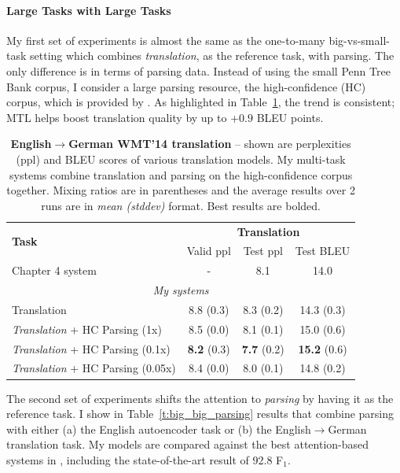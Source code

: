 \paragraph{Large Tasks with Large Tasks}
\label{subsub:ll}
My first set of experiments is almost the same as the one-to-many
big-vs-small-task setting
which combines {\it translation}, as the reference
task, with parsing. The only difference is in terms of parsing data. Instead of using the
small Penn Tree Bank corpus, I consider a large parsing resource, the
high-confidence (HC) corpus, which is provided by \citet{vinyals15grammar}.
As highlighted in Table~\ref{t:big_big_translation}, the
trend is consistent; MTL helps boost translation quality by up
to +$0.9$ BLEU points. 

\begin{table}[tbh!]
\centering
\begin{tabular}{l|c|c|c}
\multirow{ 2}{*}{\bf{Task}} & \multicolumn{3}{c}{{\bf Translation}}\\
  \cline{2-4}
  & Valid ppl & Test ppl & Test BLEU\\
  \hline
Chapter 4 system \citep{luong15attn} & - & 8.1 & 14.0 \\
  \hline
\multicolumn{4}{c}{{\it My systems}} \\
  \hline
Translation & 8.8 (0.3) & 8.3 (0.2) & 14.3 (0.3)\\
  \hline
{\it Translation} + HC Parsing (1x) &  8.5 (0.0) & 8.1 (0.1) & 15.0 (0.6) \\
{\it Translation} + HC Parsing (0.1x) &  {\bf 8.2} (0.3) & {\bf 7.7} (0.2) &
{\bf 15.2} (0.6)\\
{\it Translation} + HC Parsing (0.05x) &  8.4 (0.0) & 8.0 (0.1) & 14.8 (0.2) \\
\end{tabular}
\caption[Translation \& Large-Corpus parsing
results]{{\bf English$\rightarrow$German WMT'14 translation} -- shown are
perplexities (ppl) and BLEU scores of various translation models. My
multi-task systems combine translation and parsing on the
high-confidence corpus together. Mixing
ratios are in parentheses and the average results over 2 runs are in {\it
mean (stddev)} format. Best results are bolded.}
\label{t:big_big_translation}
\end{table}

The second set of experiments shifts the attention to {\it parsing} by having it as the reference task. 
I show in Table~\ref{t:big_big_parsing} results that combine parsing with
either (a) the English autoencoder task or (b) the English$\rightarrow$German
translation task. My models are compared against the best attention-based systems in
\citep{vinyals15grammar}, including the state-of-the-art result of 92.8 F$_1$.


